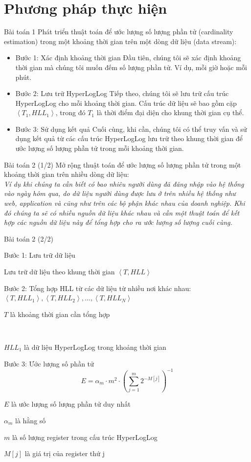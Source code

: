 \documentclass[10pt]{beamer}
\newcommand{\SubItem}[1]{
    {\setlength\itemindent{15pt} \item[-] #1}
}
\begin{document}
\section{Phương pháp thực hiện}
\begin{frame}[fragile]{Bài toán 1}
Phát triển thuật toán để ước lượng số lượng phần tử (cardinality estimation) trong 
một khoảng thời gian trên một dòng dữ liệu (data stream): 

\begin{itemize}
  \item Bước 1: Xác định khoảng thời gian
  Đầu tiên, chúng tôi sẽ xác định khoảng thời gian mà chúng tôi muốn đếm số lượng 
  phần tử. Ví dụ, mỗi giờ hoặc mỗi phút.
  \item Bước 2: Lưu trữ HyperLogLog
  Tiếp theo, chúng tôi sẽ lưu trữ cấu trúc HyperLogLog cho mỗi khoảng thời gian. 
  Cấu trúc dữ liệu sẽ bao gồm cặp $\left< T_1, HLL_1\right>$, trong đó $T_1$ là 
  thời điểm đại diện cho khung thời gian cụ thể.
  \item Bước 3: Sử dụng kết quả
  Cuối cùng, khi cần, chúng tôi có thể truy vấn và sử dụng kết quả từ các cấu trúc 
  HyperLogLog lưu trữ theo khung thời gian để ước lượng số lượng phần tử trong 
  mỗi khoảng thời gian.
\end{itemize}
\end{frame}
\begin{frame}[fragile]{Bài toán 2 (1/2)}
  Mở rộng thuật toán để ước lượng số lượng phần tử trong một khoảng thời gian trên nhiều dòng dữ liệu:\\
\vspace{0.1cm}
  \textit{ Ví dụ khi chúng ta cần biết có bao nhiêu người dùng đã đăng nhập vào hệ thống vào ngày hôm qua, do dữ liệu người dùng được lưu ở trên nhiều hệ thống như web, application và cũng như trên các bộ phận khác nhau của doanh nghiệp. Khi đó chúng ta sẽ có nhiều nguồn dữ liệu khác nhau và cần một thuật toán để kết hợp các nguồn dữ liệu này để tổng hợp cho ra ước lượng
  số lượng cuối cùng.}

\end{frame}
\begin{frame}[fragile]{Bài toán 2 (2/2)}
  \begin{itemize}
      \item Bước 1: Lưu trữ dữ liệu
      \SubItem{Lưu trữ dữ liệu theo khung thời gian $\left< T, HLL\right>$}
      \item Bước 2: Tổng hợp HLL từ các dữ liệu từ nhiều nơi khác nhau:\\
      $\left< T, HLL_1\right>, \left< T, HLL_2\right>,...,\left< T, HLL_N\right>$\\
      \SubItem{$T$ là khoảng thời gian cần tổng hợp} \\
      \SubItem{$HLL_1$ là dữ liệu HyperLogLog trong khoảng thời gian}
      \item Bước 3: Ước lượng số phần tử
      \[E = \alpha_m \cdot m^2 \cdot \left( \sum_{j=1}^{m} 2^{-M[j]} \right)^{-1}\]
      \SubItem{$E$ là ước lượng số lượng phần tử duy nhất}
      \SubItem{$\alpha_m$ là hằng số}
      \SubItem{$m$ là số lượng register trong cấu trúc HyperLogLog}
      \SubItem{$M[j]$ là giá trị của register thứ j}
\end{itemize}
\end{frame}
\end{document}
